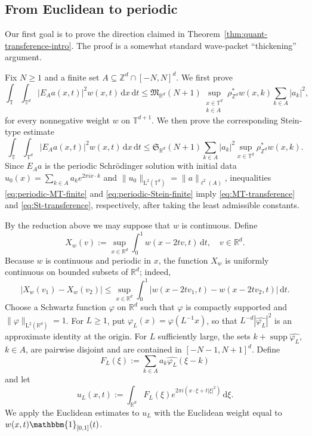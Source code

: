 \documentclass[10pt,a4paper]{amsart}
\numberwithin{equation}{section}
\newcommand{\supp}{\operatorname{supp}}
\newcommand{\dd}{\,\mathrm{d}}
\renewcommand{\leq}{\leqslant}
\renewcommand{\geq}{\geqslant}
\begin{document}
\subsection{From Euclidean to periodic}
Our first goal is to prove the direction claimed in Theorem~\ref{thm:quant-transference-intro}. The proof is a somewhat standard wave-packet ``thickening'' argument.

Fix $N\geq1$ and a finite set $A\subseteq\mathbb{Z}^d\cap[-N,N]^d$. We first prove
\begin{equation}\label{eq:periodic-MT-finite}
\int_{\mathbb{T}}\int_{\mathbb{T}^d}|E_Aa(x,t)|^2w(x,t)\dd x\dd t
\leq \mathfrak{M}_{\mathbb{R}^d}(N+1)\sup_{\substack{x\in\mathbb{T}^d\\ k\in A}}\rho^{\ast}_{\mathbb{Z}^d}w(x,k)\sum_{k\in A}|a_k|^2,
\end{equation}
for every nonnegative weight $w$ on $\mathbb{T}^{d+1}$. We then prove the corresponding Stein-type estimate
\begin{equation}\label{eq:periodic-Stein-finite}
\int_{\mathbb{T}}\int_{\mathbb{T}^d}|E_Aa(x,t)|^2w(x,t)\dd x\dd t
\leq \mathfrak{S}_{\mathbb{R}^d}(N+1)\sum_{k\in A}|a_k|^2\sup_{x\in\mathbb{T}^d}\rho^{\ast}_{\mathbb{Z}^d}w(x,k).
\end{equation}
Since $E_Aa$ is the periodic Schr\"{o}dinger solution with initial data $u_0(x)=\sum_{k\in A}a_ke^{2\pi ix\cdot k}$ and $\|u_0\|_{\mathrm{L}^2(\mathbb{T}^d)}=\|a\|_{\ell^2(A)}$, inequalities \eqref{eq:periodic-MT-finite} and \eqref{eq:periodic-Stein-finite} imply \eqref{eq:MT-transference} and \eqref{eq:St-transference}, respectively, after taking the least admissible constants.

By the reduction above we may suppose that $w$ is continuous. Define
\[ X_w(v):=\sup_{x\in\mathbb{R}^d}\int_0^1w(x-2tv,t)\dd t,\quad v\in\mathbb{R}^d. \]
Because $w$ is continuous and periodic in $x$, the function $X_w$ is uniformly continuous on bounded subsets of $\mathbb{R}^d$; indeed,
\[ |X_w(v_1)-X_w(v_2)|
\leq \sup_{x\in\mathbb{R}^d}\int_0^1|w(x-2tv_1,t)-w(x-2tv_2,t)|\dd t. \]
Choose a Schwartz function $\varphi$ on $\mathbb{R}^d$ such that $\widehat{\varphi}$ is compactly supported and $\|\varphi\|_{\mathrm{L}^2(\mathbb{R}^d)}=1$. For $L\geq1$, put $\varphi_L(x)=\varphi(L^{-1}x)$, so that $L^{-d}|\widehat{\varphi_L}|^2$ is an approximate identity at the origin. For $L$ sufficiently large, the sets $k+\supp\widehat{\varphi_L}$, $k\in A$, are pairwise disjoint and are contained in $[-N-1,N+1]^d$. Define
\[ F_L(\xi):=\sum_{k\in A}a_k\widehat{\varphi_L}(\xi-k) \]
and let
\[ u_L(x,t):=\int_{\mathbb{R}^d}F_L(\xi)e^{2\pi i(x\cdot\xi+t|\xi|^2)}\dd\xi. \]
We apply the Euclidean estimates to $u_L$ with the Euclidean weight equal to $w(x,t)\mathbbm{1}_{[0,1]}(t)$.
\end{document}
